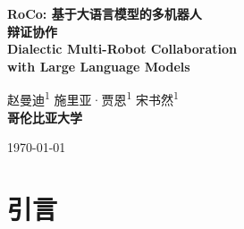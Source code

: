 \documentclass[UTF8, a4paper, 12pt]{article}
\begin{document}
\begin{titlepage}
    \centering
    \vspace*{2cm}
    
    {\LARGE\bfseries\sffamily
    RoCo: 基于大语言模型的多机器人\\
    辩证协作\\
    \vspace{1cm}
    Dialectic Multi-Robot Collaboration\\
    with Large Language Models\\
    }
    
    \vspace{2cm}
    
    \Large
    赵曼迪\textsuperscript{1} \quad 施里亚·贾恩\textsuperscript{1} \quad 宋书然\textsuperscript{1}\\
    \vspace{0.5cm}
    \textbf{哥伦比亚大学}
    
    \vfill
    
    \normalsize
    \today
    
\end{titlepage}

\begin{abstract}
\textbf{摘要：}本文提出了一种利用预训练大语言模型（Large Language Model, LLM）进行高层通信和底层路径规划的多机器人协作新方法。机器人配备大语言模型，用于讨论和集体推理任务策略。随后，它们生成子任务计划和任务空间路点路径，由多臂运动规划器加速轨迹规划。我们还提供来自环境的反馈（如碰撞检测），并提示大语言模型智能体在上下文中改进其计划和路点。在评估方面，我们引入了 RoCoBench，这是一个包含6个任务的多机器人协作基准测试，涵盖了广泛的多机器人协作场景，并附带了用于智能体表征和推理的纯文本数据集。实验证明了我们方法的有效性——它在 RoCoBench 的所有任务中都取得了较高的成功率，并能适应任务语义的变化。我们的对话设置具有高度可解释性和灵活性——在真实世界实验中，我们展示了 RoCo 易于集成人类在环，用户可以与机器人智能体交流协作，共同完成任务。详见项目网站 project-roco.github.io 获取视频和代码。

\textbf{关键词：}多机器人协作，大语言模型，运动规划，自然语言交互，智能体对话

\end{abstract}

\newpage

\tableofcontents
\newpage

\section{引言}
\end{document}
